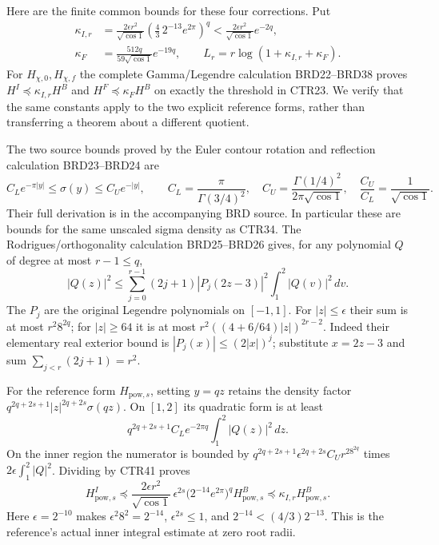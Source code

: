 \documentclass[11pt,a4paper]{article}
\begin{document}
Here are the finite common bounds for these four corrections. Put
\[
 \begin{split}
 \kappa_{I,r}
  &=\frac{2\epsilon r^2}{\sqrt{\cos1}}
       \left(\frac43\,2^{-13}e^{2\pi}\right)^q
    <\frac{2\epsilon r^2}{\sqrt{\cos1}}e^{-2q},\\
 \kappa_F&=\frac{512q}{59\sqrt{\cos1}}e^{-19q},\qquad
 L_r=r\log(1+\kappa_{I,r}+\kappa_F).
 \end{split}
 \tag{CTR38}
\]
For $H_{\chi,0},H_{\chi,f}$ the complete Gamma/Legendre calculation
BRD22--BRD38 proves
$H^I\preceq\kappa_{I,r}H^B$ and
$H^F\preceq\kappa_FH^B$ on exactly the threshold in CTR23.
We verify that the same constants apply to the two explicit reference
forms, rather than transferring a theorem about a different quotient.

The two source bounds proved by the Euler contour rotation and
reflection calculation BRD23--BRD24 are
\[
 C_Le^{-\pi|y|}\leq\sigma(y)\leq C_Ue^{-|y|},\qquad
 C_L=\frac{\pi}{\Gamma(3/4)^2},\quad
 C_U=\frac{\Gamma(1/4)^2}{2\pi\sqrt{\cos1}},\quad
 \frac{C_U}{C_L}=\frac1{\sqrt{\cos1}}.
 \tag{CTR39}
\]
Their full derivation is in the accompanying BRD source. In particular
these are bounds for the same unscaled sigma density as CTR34.
The Rodrigues/orthogonality calculation BRD25--BRD26 gives, for any
polynomial $Q$ of degree at most $r-1\leq q$,
\[
 |Q(z)|^2\leq
 \sum_{j=0}^{r-1}(2j+1)|P_j(2z-3)|^2\int_1^2|Q(v)|^2\,dv.
 \tag{CTR40}
\]
The $P_j$ are the original Legendre polynomials on $[-1,1]$.
For $|z|\leq\epsilon$ their sum is at most $r^2 8^{2q}$;
for $|z|\geq64$ it is at most
$r^2((4+6/64)|z|)^{2r-2}$.
Indeed their elementary real exterior bound is
$|P_j(x)|\leq(2|x|)^j$; substitute $x=2z-3$ and sum
$\sum_{j<r}(2j+1)=r^2$.

For the reference form $H_{\mathrm{pow},s}$, setting $y=qz$ retains
the density factor $q^{2q+2s+1}|z|^{2q+2s}\sigma(qz)$.
On $[1,2]$ its quadratic form is at least
\[
 q^{2q+2s+1}C_Le^{-2\pi q}\int_1^2|Q(z)|^2\,dz.
 \tag{CTR41}
\]
On the inner region the numerator is bounded by
$q^{2q+2s+1}\epsilon^{2q+2s}C_Ur^28^{2q}$
times $2\epsilon\int_1^2|Q|^2$. Dividing by CTR41 proves
\[
 H_{\mathrm{pow},s}^I\preceq
 \frac{2\epsilon r^2}{\sqrt{\cos1}}\,
       \epsilon^{2s}\bigl(2^{-14}e^{2\pi}\bigr)^q
       H_{\mathrm{pow},s}^B
 \preceq\kappa_{I,r}H_{\mathrm{pow},s}^B.
 \tag{CTR42}
\]
Here $\epsilon=2^{-10}$ makes $\epsilon^2 8^2=2^{-14}$,
$\epsilon^{2s}\leq1$, and
$2^{-14}<(4/3)2^{-13}$. This is the reference's actual
inner integral estimate at zero root radii.
\end{document}
